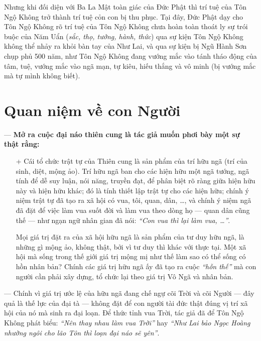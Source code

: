Nhưng khi đối diện với Ba La Mật toàn giác của Đức Phật thì trí tuệ của Tôn Ngộ Không trở thành trí tuệ cỏn con bị thu phục. Tại đây, Đức Phật dạy cho Tôn Ngộ Không rõ trí tuệ của Tôn Ngộ Không chưa hoàn toàn thoát ly sự trói buộc của Năm Uẩn (\emph{sắc, thọ, tưởng, hành, thức}) qua sự kiện Tôn Ngộ Không không thể nhảy ra khỏi bàn tay của Như Lai, và qua sự kiện bị Ngũ Hành Sơn chụp phủ 500 năm, như Tôn Ngộ Không đang vướng mắc vào tánh tháo động của tâm, tuệ, vướng mắc vào ngã mạn, tự kiêu, hiếu thắng và vô minh (bị vướng mắc mà tự mình không biết).


\section{Quan niệm về con Người} %
\label{sec:4_con_nguoi}

--- {\bf Mở ra cuộc đại náo thiên cung là tác giả muốn phơi bày một sự thật rằng:}

\begin{enumerate}[label=\itshape\alph*\upshape/]

    \item[+] Cái tổ chức trật tự của Thiên cung là sản phẩm của trí hữu ngã (trí của sinh, diệt, mộng ảo). Trí hữu ngã ban cho các hiện hữu một ngã tướng, ngã tính để dễ suy luận, nói năng, truyền đạt, để phân biệt rõ ràng giữa hiện hữu này và hiện hữu khác; đó là tính thiết lập trật tự cho các hiện hữu; chính ý niệm trật tự đã tạo ra xã hội có vua, tôi, quan, dân, \ldots, và chính ý niệm ngã đã đặt để việc làm vua suốt đời và làm vua theo dòng họ --- quan dân cũng thế --- như ngạn ngữ nhân gian đã nói: \emph{``Con vua thì lại làm vua, \ldots''}.

    Mọi giá trị đặt ra của xã hội hữu ngã là sản phẩm của tư duy hữu ngã, là những gì mộng ảo, không thật, bởi vì tư duy thì khác với thực tại. Một xã hội mà sống trong thế giới giá trị mộng mị như thế làm sao có thể sống có hồn nhân bản? Chính các giá trị hữu ngã ấy đã tạo ra cuộc \emph{``hỗn thế''} mà con người cần phải xây dựng, tổ chức lại theo giá trị Vô Ngã và nhân bản.
\end{enumerate}

--- Chính vì giá trị ước lệ của hữu ngã đang chế ngự cõi Trời và cõi Người --- đây quả là thế lực của đại tà --- không đặt để con người tài đức thật đúng vị trí xã hội của nó mà sinh ra đại loạn. Để thức tỉnh vua Trời, tác giả đã để Tôn Ngộ Không phát biểu: \emph{``Nên thay nhau làm vua Trời''} hay \emph{``Như Lai bảo Ngọc Hoàng nhường ngôi cho lão Tôn thì loạn đại náo sẽ yên''}.


